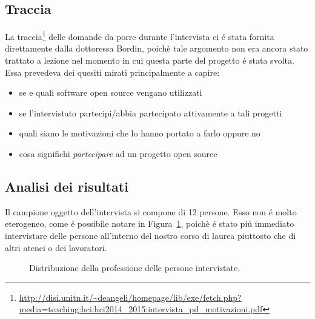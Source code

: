 \documentclass[12pt]{article} %
\begin{document}
\subsection{Traccia}
La traccia\footnote{\url{http://disi.unitn.it/~deangeli/homepage/lib/exe/fetch.php?media=teaching:hci:hci2014_2015:intervista_pd_motivazioni.pdf}} delle domande da porre durante l'intervista ci \'e stata fornita direttamente dalla dottoressa Bordin, poich\`e tale argomento non era ancora stato trattato a lezione nel momento in cui questa parte del progetto \'e stata svolta.\\
Essa prevedeva dei quesiti mirati principalmente a capire:
\begin{itemize}
\item se e quali software open source vengano utilizzati
\item se l'intervistato partecipi/abbia partecipato attivamente a tali progetti
\item quali siano le motivazioni che lo hanno portato a farlo oppure no
\item cosa significhi \emph{partecipare} ad un progetto open source
\end{itemize}

\subsection{Analisi dei risultati}
Il campione oggetto dell'intervista si compone di 12 persone. Esso non \'e molto eterogeneo, come \'e possibile notare in Figura~\ref{fig:distribuzione}, poich\`e \'e stato pi\'u immediato intervistare delle persone all'interno del nostro corso di laurea piuttosto che di altri atenei o dei lavoratori.

\begin{figure}[H]
\caption{Distribuzione della professione delle persone intervistate.}
\label{fig:distribuzione}
\end{figure}
\end{document}
